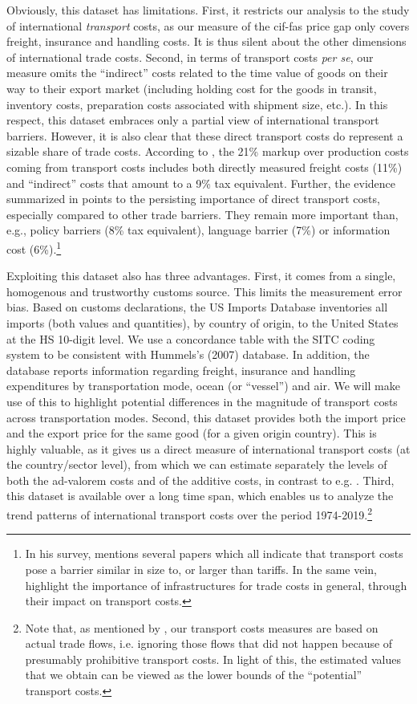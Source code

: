 \documentclass[a4paper,11pt]{article}
\begin{document}
Obviously, this dataset has limitations.
First, it restricts our analysis to the study of international \emph{transport} costs, as our measure of the cif-fas price gap only covers freight, insurance and handling costs.
It is thus silent about the other dimensions of international trade costs.
Second, in terms of transport costs \textit{per se}, our measure omits the ``indirect'' costs related to the time value of goods on their way to their export market (including holding cost for the goods in transit, inventory costs, preparation costs associated with shipment size, etc.).
In this respect, this dataset embraces only a partial view of international transport barriers.
However, it is also clear that these direct transport costs do represent a sizable share of trade costs.
According to \cite{anderson_wincoop_jel}, the 21\% markup over production costs coming from transport costs includes both directly measured freight costs (11\%) and ``indirect'' costs that amount to a  9\% tax equivalent.
Further, the evidence summarized in \cite{anderson_wincoop_jel} points to the persisting importance of direct transport costs, especially compared to other trade barriers.
They remain more important than, e.g., policy barriers (8\% tax equivalent), language barrier (7\%) or information cost (6\%).\footnote{In his survey, \cite{Hummels_1999} mentions several papers which all indicate that transport costs pose a barrier similar in size to, or larger than tariffs.
In the same vein, \cite{limao_venables} highlight the importance of infrastructures for trade costs in general, through their impact on transport costs.}

Exploiting this dataset also has three advantages.
First, it comes from a single, homogenous and trustworthy customs source.
This limits the measurement error bias.
Based on customs declarations, the US Imports Database inventories all imports (both values and quantities), by country of origin, to the United States at the HS 10-digit level. We use a concordance table with the SITC coding system to be consistent with Hummels's (2007) database. In addition, the database reports information regarding freight, insurance and handling expenditures by transportation mode, ocean (or ``vessel'') and air. We will make use of this to highlight potential differences in the magnitude of transport costs across transportation modes.
Second, this dataset provides both the import price and the export price for the same good (for a given origin country).
This is highly valuable, as it gives us a direct measure of international transport costs (at the country/sector level), from which we can estimate separately the levels of both the ad-valorem costs and of the additive costs, in contrast to e.g. \cite{Irrazabal_2015}.
Third, this dataset is available over a long time span, which enables us to analyze the trend patterns of international transport costs over the period 1974-2019.\footnote{Note that, as mentioned by \cite{Lafourcade_Thisse}, our transport costs measures are based on actual trade flows, i.e. ignoring those flows that did not happen because of presumably prohibitive transport costs.
In light of this, the estimated values that we obtain can be viewed as the lower bounds of the ``potential'' transport costs.} \smallskip
\end{document}
